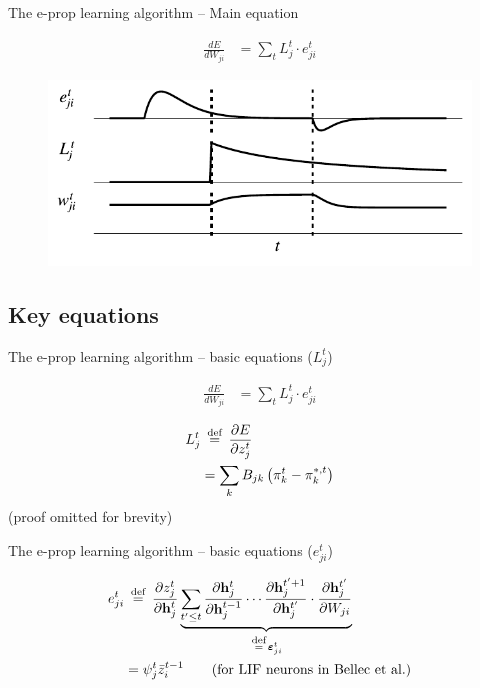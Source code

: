 \documentclass[t]{beamer}
\newcommand\eqdef{\ \mathrel{\overset{\makebox[0pt]{\mbox{\normalfont\scriptsize\rmfamily def}}}{=}}\ }
\begin{document}
\begin{frame}{The e-prop learning algorithm -- Main equation}

	\begin{align*}
		\frac{dE}{dW_{ji}}
		&= \sum_tL_j^t \cdot e_{ji}^t
	\end{align*}

	\begin{figure}[!ht]
		\includegraphics[width=0.8\linewidth]{eligibility.pdf}
	\end{figure}

\end{frame}

\subsection{Key equations}
\begin{frame}{The e-prop learning algorithm -- basic equations ($L^t_j$)}

	\begin{align*}
		\frac{dE}{dW_{ji}}
		&= \sum_tL_j^t \cdot e_{ji}^t
	\end{align*}

	\begin{align*}
L^t_j &\eqdef \frac{\partial E}{\partial z^t_j}\\ &= \sum_kB_{jk}\left(\pi^t_k-\pi_k^{*,t}\right)
\end{align*}
	(proof omitted for brevity)

\end{frame}

\begin{frame}{The e-prop learning algorithm -- basic equations ($e^t_{ji}$)}

	\begin{align*}
e^t_{ji} &\eqdef \frac{\partial z_j^t}{\partial\mathbf{h}_j^t}\underbrace{\sum_{t'\leq t}\frac{\partial\mathbf{h}^t_j}{\partial\mathbf{h}_j^{t-1}} \cdots \frac{\partial\mathbf{h}_j^{t'+1}}{\partial\mathbf{h}_j^{t'}}\cdot\frac{\partial\mathbf{h}_j^{t'}}{\partial W_{ji}}}_{\eqdef \bm{\varepsilon}_{ji}^t}\\
&= \psi_j^t\bar{z}^{t-1}_i\qquad\text{(for LIF neurons in Bellec et al.)}
\end{align*}


\end{frame}
\end{document}
